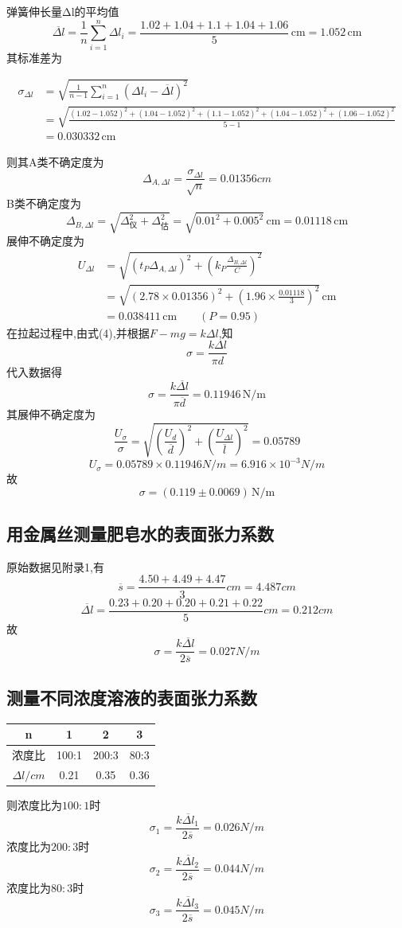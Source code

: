 \documentclass[12pt,a4paper,oneside]{ctexart}
\begin{document}
\noindent
弹簧伸长量Δl的平均值
$$
\overline{\Delta l}=\frac{1}{n}\sum_{i=1}^{n}\Delta l_i=\frac{1.02+1.04+1.1+1.04+1.06}{5}\,\mathrm{cm}=1.052\,\mathrm{cm}
$$
其标准差为
\begin{small}
$$
\begin{aligned}
\sigma_{\Delta l}&=\sqrt{\frac{1}{n-1}\sum_{i=1}^n\left(\Delta l_i-\overline{\Delta l}\right)^2}\\
&=\sqrt{\frac{(1.02-1.052)^2+(1.04-1.052)^2+(1.1-1.052)^2+(1.04-1.052)^2+(1.06-1.052)^2}{5-1}}\\
&=0.030332\,\mathrm{cm}
\end{aligned}
$$
\end{small}
则其A类不确定度为
$$\Delta_{A,\Delta l}=\dfrac{\sigma_{\Delta l}}{\sqrt{n}}=0.01356cm$$
B类不确定度为
$$
\Delta_{B,\Delta l}=\sqrt{\Delta_\text{仪}^2+\Delta_\text{估}^2}=\sqrt{0.01^2+0.005^2}\,\mathrm{cm}=0.01118\,\mathrm{cm}
$$
展伸不确定度为
$$
\begin{aligned}
U_{\Delta l}&=\sqrt{\left(t_P\Delta_{A,\Delta l}\right)^2+\left(k_P\frac{\Delta_{B,\Delta l}}{C}\right)^2}\\
&=\sqrt{\left(2.78\times0.01356\right)^2+\left(1.96\times\frac{0.01118}{3}\right)^2}\,\mathrm{cm}\\
&=0.038411\,\mathrm{cm} \qquad(P=0.95)
\end{aligned}
$$
在拉起过程中,由式(4),并根据$F-mg=k\Delta l$,知
\begin{equation}
    \sigma = \dfrac{k\Delta l}{\pi d}
\end{equation}
代入数据得
$$
\sigma=\frac{k \overline{\Delta l}}{\pi \overline{d}}=0.11946\,\mathrm{N/m}
$$
其展伸不确定度为
$$
\dfrac{U_{\sigma}}{\sigma}=\sqrt{\left(\frac{U_d}{\overline{d}}\right)^2
+\left(\frac{U_{\Delta l}}{\overline{l}}\right)^2}=0.05789
$$
$$
U_{\sigma}=0.05789\times0.11946N/m=6.916\times10^{-3}N/m$$
故
$$
\sigma=\left(0.119 \pm 0.0069\right)\,\mathrm{N/m}
$$
\subsection{用金属丝测量肥皂水的表面张力系数} \noindent
原始数据见附录1,有
$$\overline{s}=\dfrac{4.50+4.49+4.47}{3}cm=4.487cm$$
$$\overline{\Delta l}=\dfrac{0.23+0.20+0.20+0.21+0.22}{5}cm= 0.212cm$$
故
$$\sigma=\dfrac{k\overline{\Delta l}}{2\overline{s}}=0.027N/m$$
\subsection{测量不同浓度溶液的表面张力系数}
\begin{center}
    \begin{tabular}{|c|c|c|c|}
        \hline
        n&1&2&3\\
        \hline
        浓度比&100:1&200:3&80:3\\
        \hline
        $\Delta l/cm$&0.21&0.35&0.36\\
        \hline
    \end{tabular}
\end{center}
则浓度比为$100:1$时
$$\sigma_1=\dfrac{k\overline{\Delta l}_1}{2\overline{s}}=0.026N/m$$
浓度比为$200:3$时
$$\sigma_2=\dfrac{k\overline{\Delta l}_2}{2\overline{s}}=0.044N/m$$
浓度比为$80:3$时
$$\sigma_3=\dfrac{k\overline{\Delta l}_3}{2\overline{s}}=0.045N/m$$
\end{document}

